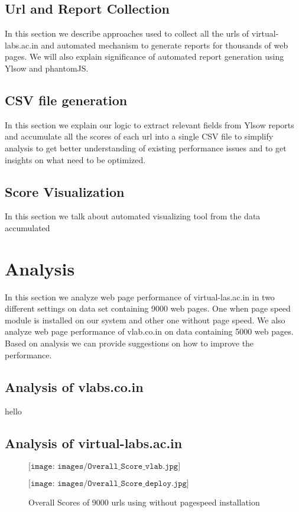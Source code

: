 \documentclass[a4paper,10pt]{IEEEtran}
\begin{document}
\subsection{Url and Report Collection}
In this section we describe approaches used to collect all the urls of virtual-labs.ac.in and automated mechanism to generate reports for
thousands of web pages. We will also explain significance of automated report generation using Ylsow and phantomJS.
\subsection{CSV file generation}
In this section we explain our logic to extract relevant fields from Ylsow reports and accumulate all the scores of each url into a single CSV file to
simplify analysis to get better understanding of existing performance issues and to get insights on what need to be optimized.
\subsection{Score Visualization}
In this section we talk about automated visualizing tool from the data accumulated 

\section{Analysis}
In this section we analyze web page performance of virtual-las.ac.in in two different settings on data set containing 9000 web pages.
One when page speed module is installed on our system and other one without page speed. We also analyze web page performance of vlab.co.in  
on data containing 5000 web pages. Based on analysis we can provide suggestions on how to improve the performance. 
\subsection{Analysis of vlabs.co.in}
hello
\subsection{Analysis of virtual-labs.ac.in}
\begin{figure}[ht]
 \centering
$\texttt{[image: images/Overall\_Score\_vlab.jpg]}$
\caption{}
\label{fig1}
\end{figure}



\begin{figure}[ht]
 \centering
$\texttt{[image: images/Overall\_Score\_deploy.jpg]}$
\caption{Overall Scores of 9000 urls using without pagespeed installation}
\label{fig1}
\end{figure}
\end{document}
